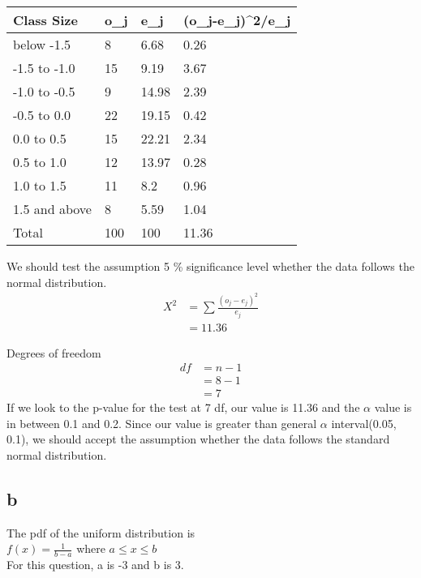 \documentclass[11pt]{article}
\begin{document}
\begin{table}[H]
\centering
\begin{tabular}{|l|l|l|l|}
\hline
Class Size    & o\_j & e\_j  & (o\_j-e\_j)\textasciicircum{}2/e\_j \\ \hline
below -1.5    & 8    & 6.68  & 0.26                                \\ \hline
-1.5 to -1.0  & 15   & 9.19 & 3.67                                \\ \hline
-1.0 to -0.5  & 9    & 14.98 & 2.39                                \\ \hline
-0.5 to 0.0   & 22   & 19.15 & 0.42                                \\ \hline
0.0 to 0.5    & 15   & 22.21 & 2.34                                \\ \hline
0.5 to 1.0    & 12   & 13.97 & 0.28                                \\ \hline
1.0 to 1.5    & 11   & 8.2  & 0.96                                \\ \hline
1.5 and above    & 8    & 5.59  & 1.04                                \\ \hline
Total         & 100  & 100   & 11.36                              \\ \hline
\end{tabular}
\end{table}

We should test the assumption 5 \% significance level whether the data follows the normal distribution.\\
\begin{align*}
X^2 &= \sum \frac{(o_j - e_j)^2}{e_j}\\
&= 11.36
\end{align*}

Degrees of freedom \\
\begin{align*}
df &= n-1\\
&=8 - 1\\
&= 7
\end{align*}
If we look to the p-value for the test at 7 df, our value is 11.36 and the $\alpha$ value is in between 0.1 and 0.2. Since our value is greater than general $\alpha$ interval(0.05, 0.1), we should accept the assumption whether the data follows the standard normal distribution.
\subsection*{b}
The pdf of the uniform distribution is \\
$f(x) = \frac{1}{b-a}$ where $a \leq x \leq b$\\
For this question, a is -3 and b is 3.\\
\end{document}
